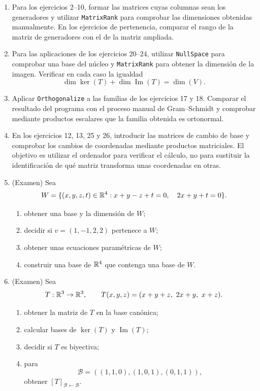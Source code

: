 \begin{enumerate}[label=\textbf{\arabic*.},leftmargin=*]
\item \M Para los ejercicios 2--10, formar las matrices cuyas columnas sean los generadores y utilizar \texttt{MatrixRank} para comprobar las dimensiones obtenidas manualmente. En los ejercicios de pertenencia, comparar el rango de la matriz de generadores con el de la matriz ampliada.

\item \M Para las aplicaciones de los ejercicios 20--24, utilizar \texttt{NullSpace} para comprobar una base del núcleo y \texttt{MatrixRank} para obtener la dimensión de la imagen. Verificar en cada caso la igualdad
\[
\dim\ker(T)+\dim\operatorname{Im}(T)=\dim(V).
\]

\item \M Aplicar \texttt{Orthogonalize} a las familias de los ejercicios 17 y 18. Comparar el resultado del programa con el proceso manual de Gram--Schmidt y comprobar mediante productos escalares que la familia obtenida es ortonormal.

\item \M En los ejercicios 12, 13, 25 y 26, introducir las matrices de cambio de base y comprobar los cambios de coordenadas mediante productos matriciales. El objetivo es utilizar el ordenador para verificar el cálculo, no para sustituir la identificación de qué matriz transforma unas coordenadas en otras.

\item (Examen) Sea
\[
W=\{(x,y,z,t)\in\mathbb{R}^4:x+y-z+t=0,\quad 2x+y+t=0\}.
\]
\begin{enumerate}[label=\alph*)]
\item obtener una base y la dimensión de $W$;
\item decidir si $v=(1,-1,2,2)$ pertenece a $W$;
\item obtener unas ecuaciones paramétricas de $W$;
\item construir una base de $\mathbb{R}^4$ que contenga una base de $W$.
\end{enumerate}

\item (Examen) Sea
\[
T:\mathbb{R}^3\to\mathbb{R}^3,
\qquad
T(x,y,z)=(x+y+z,\ 2x+y,\ x+z).
\]
\begin{enumerate}[label=\alph*)]
\item obtener la matriz de $T$ en la base canónica;
\item calcular bases de $\ker(T)$ y $\operatorname{Im}(T)$;
\item decidir si $T$ es biyectiva;
\item para
\[
\mathcal B=((1,1,0),(1,0,1),(0,1,1)),
\]
obtener $[T]_{\mathcal B\leftarrow\mathcal B}$.
\end{enumerate}


\end{enumerate}
